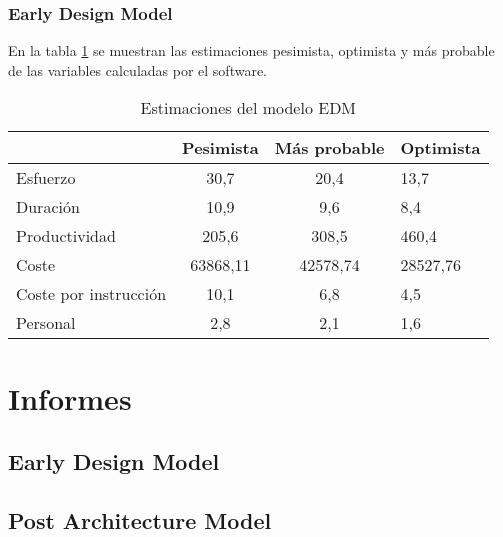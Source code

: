\documentclass[11pt,a4paper,spanish,twoside]{report}
\begin{document}
\subsection{Early Design Model}
En la tabla \ref{Tab:EstEDM} se muestran las estimaciones pesimista,
optimista y más probable de las variables calculadas por el software.
\begin{table}[!h]
  \centering
  \begin{tabular}{p{4.5cm}|c|c|b{2cm}<{\centering}}
    & \textbf{Pesimista} & \textbf{Más probable} & \textbf{Optimista}\\
    \hline \hline
    Esfuerzo & 30,7 & 20,4 & 13,7 \\ \hline
    Duración & 10,9 & 9,6 & 8,4 \\ \hline
    Productividad & 205,6 & 308,5 & 460,4 \\ \hline
    Coste & 63868,11 & 42578,74 & 28527,76 \\ \hline
    Coste por instrucción & 10,1 & 6,8 & 4,5 \\ \hline
    Personal & 2,8 & 2,1 & 1,6 \\ \hline
  \end{tabular}
  \caption{Estimaciones del modelo EDM} \label{Tab:EstEDM}
\end{table}

\chapter{Informes}
\section{Early Design Model}
\section{Post Architecture Model}
\end{document}
